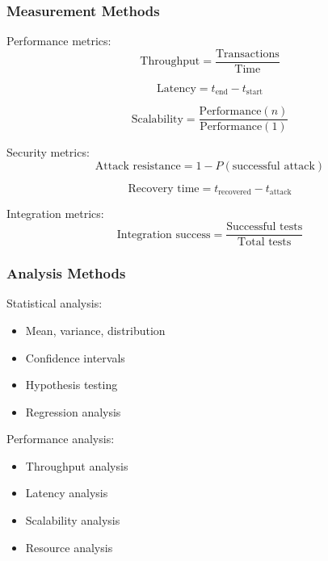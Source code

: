 \documentclass[12pt]{article}
\begin{document}
\subsubsection{Measurement Methods}

Performance metrics:
\begin{equation}
\text{Throughput} = \frac{\text{Transactions}}{\text{Time}}
\end{equation}

\begin{equation}
\text{Latency} = t_{\text{end}} - t_{\text{start}}
\end{equation}

\begin{equation}
\text{Scalability} = \frac{\text{Performance}(n)}{\text{Performance}(1)}
\end{equation}

Security metrics:
\begin{equation}
\text{Attack resistance} = 1 - P(\text{successful attack})
\end{equation}

\begin{equation}
\text{Recovery time} = t_{\text{recovered}} - t_{\text{attack}}
\end{equation}

Integration metrics:
\begin{equation}
\text{Integration success} = \frac{\text{Successful tests}}{\text{Total tests}}
\end{equation}

\subsubsection{Analysis Methods}

Statistical analysis:
\begin{itemize}
\item Mean, variance, distribution
\item Confidence intervals
\item Hypothesis testing
\item Regression analysis
\end{itemize}

Performance analysis:
\begin{itemize}
\item Throughput analysis
\item Latency analysis
\item Scalability analysis
\item Resource analysis
\end{itemize}
\end{document}
